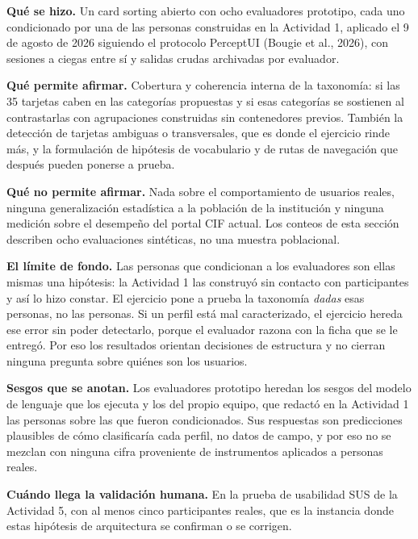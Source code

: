 \begin{uxnota}
\textbf{Qué se hizo.} Un card sorting abierto con ocho evaluadores prototipo, cada uno condicionado por una de las personas construidas en la Actividad 1, aplicado el 9 de agosto de 2026 siguiendo el protocolo PerceptUI (Bougie et al., 2026), con sesiones a ciegas entre sí y salidas crudas archivadas por evaluador.

\textbf{Qué permite afirmar.} Cobertura y coherencia interna de la taxonomía: si las 35 tarjetas caben en las categorías propuestas y si esas categorías se sostienen al contrastarlas con agrupaciones construidas sin contenedores previos. También la detección de tarjetas ambiguas o transversales, que es donde el ejercicio rinde más, y la formulación de hipótesis de vocabulario y de rutas de navegación que después pueden ponerse a prueba.

\textbf{Qué no permite afirmar.} Nada sobre el comportamiento de usuarios reales, ninguna generalización estadística a la población de la institución y ninguna medición sobre el desempeño del portal CIF actual. Los conteos de esta sección describen ocho evaluaciones sintéticas, no una muestra poblacional.

\textbf{El límite de fondo.} Las personas que condicionan a los evaluadores son ellas mismas una hipótesis: la Actividad 1 las construyó sin contacto con participantes y así lo hizo constar. El ejercicio pone a prueba la taxonomía \textit{dadas} esas personas, no las personas. Si un perfil está mal caracterizado, el ejercicio hereda ese error sin poder detectarlo, porque el evaluador razona con la ficha que se le entregó. Por eso los resultados orientan decisiones de estructura y no cierran ninguna pregunta sobre quiénes son los usuarios.

\textbf{Sesgos que se anotan.} Los evaluadores prototipo heredan los sesgos del modelo de lenguaje que los ejecuta y los del propio equipo, que redactó en la Actividad 1 las personas sobre las que fueron condicionados. Sus respuestas son predicciones plausibles de cómo clasificaría cada perfil, no datos de campo, y por eso no se mezclan con ninguna cifra proveniente de instrumentos aplicados a personas reales.

\textbf{Cuándo llega la validación humana.} En la prueba de usabilidad SUS de la Actividad 5, con al menos cinco participantes reales, que es la instancia donde estas hipótesis de arquitectura se confirman o se corrigen.
\end{uxnota}
